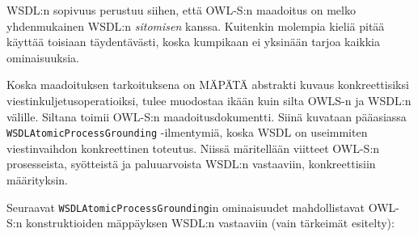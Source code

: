 \documentclass[finnish]{tktltiki2}
\theoremstyle{definition}
\theoremstyle{remark}
\begin{document}
WSDL:n sopivuus perustuu siihen, että OWL-S:n maadoitus on melko yhdenmukainen WSDL:n \textit{sitomisen} kanssa\cite{OWLS}. Kuitenkin molempia kieliä pitää käyttää toisiaan täydentävästi, koska kumpikaan ei yksinään tarjoa kaikkia ominaisuuksia. 


Koska maadoituksen tarkoituksena on MÄPÄTÄ abstrakti kuvaus konkreettisiksi viestinkuljetusoperatioiksi, tulee muodostaa ikään kuin silta OWLS-n ja WSDL:n välille. Siltana toimii OWL-S:n maadoitusdokumentti. Siinä kuvataan pääasiassa \texttt{WSDLAtomicProcessGrounding} -ilmentymiä, koska WSDL on useimmiten viestinvaihdon konkreettinen toteutus. Niissä märitellään viitteet OWL-S:n  prosesseista, syötteistä ja paluuarvoista WSDL:n vastaaviin, konkreettisiin määrityksin. 

Seuraavat \texttt{WSDLAtomicProcessGrounding}in ominaisuudet mahdollistavat OWL-S:n konstruktioiden mäppäyksen WSDL:n vastaaviin (vain tärkeimät esitelty):
\end{document}

